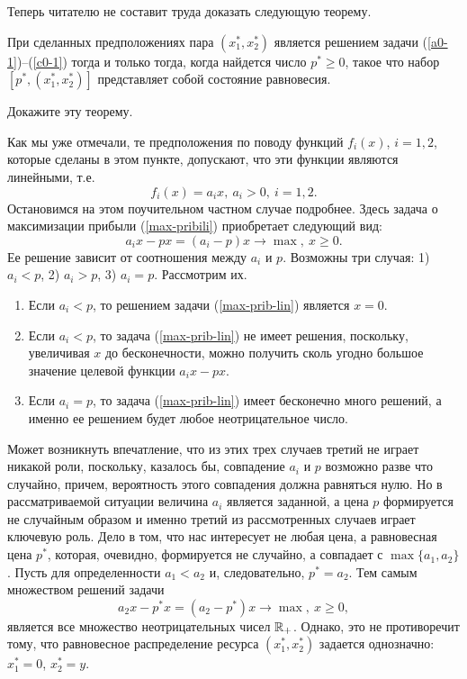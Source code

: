     Теперь читателю не составит труда доказать следующую теорему.
    \begin{teo}
    \label{teorema2}
    При сделанных
    предположениях пара $(x_{1}^{*},x_{2}^{*})$ является  решением
    задачи (\ref{a0-1})--(\ref{c0-1}) тогда и
    только тогда, когда найдется число $p^{*}\geqslant0$, такое что набор
    $[p^{*},(x_{1}^{*},x_{2}^{*})]$ представляет собой состояние
    равновесия.
    \end{teo}

\begin{exer}
    Докажите эту теорему.
\end{exer}

    Как мы уже отмечали, те предположения по поводу функций
    $f_{i}(x)$, $i=1,2$, которые сделаны в этом пункте, допускают, что эти функции
    являются линейными, т.е.
    \[f_{i}(x)=a_{i}x, \ a_{i}>0, \ i=1,2.\]
    Остановимся на этом поучительном частном случае подробнее.
    Здесь задача о максимизации прибыли (\ref{max-pribili})
    приобретает следующий вид:
    \begin{equation}
    \label{max-prib-lin}
    a_{i}x-px=(a_{i}-p)x\rightarrow\max, \ x\geqslant0.
    \end{equation}
    Ее решение зависит от соотношения между $a_{i}$ и $p$. Возможны
    три случая: 1) $a_{i}<p$, 2) $a_{i}>p$, 3) $a_{i}=p$. Рассмотрим
    их.
\begin{enumerate}[1)]
\item
    Если $a_{i}<p$, то решением задачи (\ref{max-prib-lin}) является
    $x=0$.
\item
    Если $a_{i}<p$, то задача (\ref{max-prib-lin}) не имеет решения,
    поскольку, увеличивая  $x$ до бесконечности, можно получить сколь угодно большое
    значение целевой функции $a_{i}x-px$.
\item
    Если $a_{i}=p$, то задача (\ref{max-prib-lin}) имеет бесконечно
    много решений, а именно ее решением будет любое неотрицательное
    число.
\end{enumerate}

    Может возникнуть впечатление, что из этих трех случаев третий не играет никакой
    роли, поскольку, казалось бы, совпадение $a_{i}$ и $p$ возможно
    разве что случайно, причем, вероятность этого совпадения должна
    равняться нулю. Но в рассматриваемой ситуации величина $a_{i}$
    является заданной, а цена $p$ формируется не случайным образом и
    именно третий из рассмотренных случаев играет ключевую роль.
    Дело в том, что нас интересует не любая цена, а равновесная цена
    $p^{*}$, которая, очевидно,
    формируется не случайно, а совпадает с $\max\{a_{1}, a_{2}\}$.
    Пусть для определенности $a_{1}<a_{2}$ и, следовательно, $p^{*}=a_{2}$.
    Тем самым множеством решений  задачи
    \[a_{2}x-p^{*}x=(a_{2}-p^{*})x\rightarrow\max, \ x\geqslant0,\]
    является все множество неотрицательных чисел $\mathbb{R}_{+}$. Однако,
    это не противоречит тому, что равновесное распределение ресурса
    $(x_{1}^{*},x_{2}^{*})$ задается однозначно: $x_{1}^{*}=0$,
    $x_{2}^{*}=y$.


